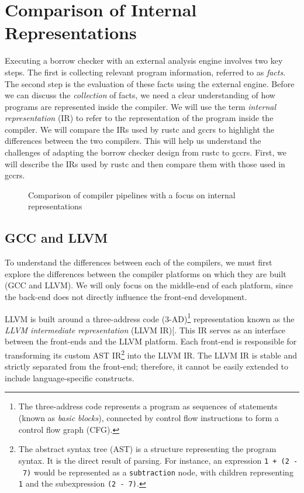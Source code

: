\documentclass[
  11pt,
  twoside]{report}
\begin{document}
\chapter{Comparison of Internal
Representations}\label{sec:comparison-of-internal-representations}

Executing a borrow checker with an external analysis engine involves two
key steps. The first is collecting relevant program information,
referred to as \emph{facts}. The second step is the evaluation of these
facts using the external engine. Before we can discuss the
\emph{collection} of facts, we need a clear understanding of how
programs are represented inside the compiler. We will use the term
\emph{internal representation} (IR) to refer to the representation of
the program inside the compiler. We will compare the IRs used by rustc
and gccrs to highlight the differences between the two compilers. This
will help us understand the challenges of adapting the borrow checker
design from rustc to gccrs. First, we will describe the IRs used by
rustc and then compare them with those used in gccrs.

\vskip 5mm

\begin{figure}
\centering

\caption{Comparison of compiler pipelines with a focus on internal
representations}
\end{figure}

\section{GCC and LLVM}\label{sec:gcc-and-llvm}

To understand the differences between each of the compilers, we must
first explore the differences between the compiler platforms on which
they are built (GCC and LLVM). We will only focus on the middle-end of
each platform, since the back-end does not directly influence the
front-end development.

LLVM is built around a three-address code (3-AD)\footnote{The
  three-address code represents a program as sequences of statements
  (known as \emph{basic blocks}), connected by control flow instructions
  to form a control flow graph (CFG).} representation known as the
\emph{LLVM intermediate representation} (LLVM
IR){[}\citeproc{ref-llvm}{11}{]}. This IR serves as an interface between
the front-ends and the LLVM platform. Each front-end is responsible for
transforming its custom AST IR\footnote{The abstract syntax tree (AST)
  is a structure representing the program syntax. It is the direct
  result of parsing. For instance, an expression
  \texttt{1\ +\ (2\ -\ 7)} would be represented as a
  \texttt{subtraction} node, with children representing \texttt{1} and
  the subexpression \texttt{(2\ -\ 7)}.} into the LLVM IR. The LLVM IR
is stable and strictly separated from the front-end; therefore, it
cannot be easily extended to include language-specific constructs.
\end{document}
